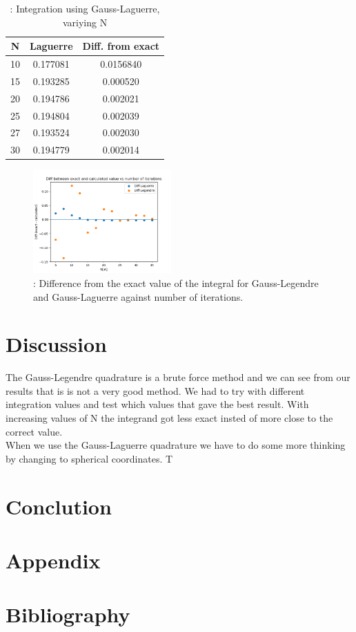 \documentclass{article}
\begin{document}
\begin{table}[h!]
  \caption{: Integration using Gauss-Laguerre, variying N}
  \begin{tabular}{c c c}
    N & Laguerre & Diff. from exact \\
    \hline
    10 & 0.177081 & 0.0156840 \\
    15 & 0.193285 & 0.000520 \\
    20 & 0.194786 & 0.002021 \\
    25 & 0.194804 & 0.002039 \\
    27 & 0.193524 & 0.002030 \\
    30 & 0.194779 & 0.002014 \\
  \end{tabular}
  \label{Tab: Laguerre}
\end{table}

\begin{figure}[hbt]
\begin{center}
    \includegraphics[width=200px]{Leg_lag_diff.png}
    \caption{: Difference from the exact value of the integral for Gauss-Legendre and Gauss-Laguerre against number of iterations.}
    \label{fig:diff}
\end{center}
\end{figure}


\section*{Discussion}
The Gauss-Legendre quadrature is a brute force method and we can see from our results that is is not a very good method. We had to try with different integration values and test which values that gave the best result. With increasing values of N the integrand got less exact insted of more close to the correct value.\\
When we use the Gauss-Laguerre quadrature we have to do some more thinking by changing to spherical coordinates. T

\section*{Conclution}

\section*{Appendix}


\section*{Bibliography}
\end{document}
